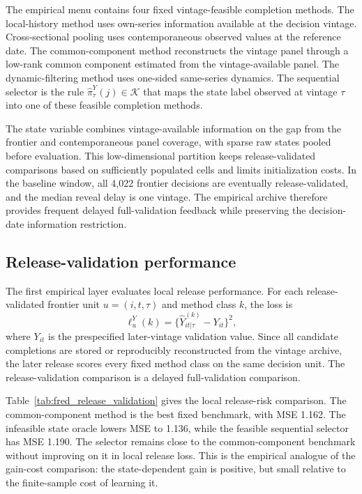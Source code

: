 \documentclass[a4paper, 12pt]{article}
\theoremstyle{plain}
\theoremstyle{remark}
\newcommand{\Kcal}{\mathcal{K}}
\newcommand{\1}{\mathbf{1}}
\begin{document}
The empirical menu contains four fixed vintage-feasible completion methods. The local-history method uses own-series information available at the decision vintage. Cross-sectional pooling uses contemporaneous observed values at the reference date. The common-component method reconstructs the vintage panel through a low-rank common component estimated from the vintage-available panel. The dynamic-filtering method uses one-sided same-series dynamics. The sequential selector is the rule \(\widehat\pi^Y_\tau(j)\in\Kcal\) that maps the state label observed at vintage \(\tau\) into one of these feasible completion methods.

The state variable combines vintage-available information on the gap from the frontier and contemporaneous panel coverage, with sparse raw states pooled before evaluation. This low-dimensional partition keeps release-validated comparisons based on sufficiently populated cells and limits initialization costs. In the baseline window, all 4,022 frontier decisions are eventually release-validated, and the median reveal delay is one vintage. The empirical archive therefore provides frequent delayed full-validation feedback while preserving the decision-date information restriction.

\subsection{Release-validation performance}
\label{subsec:fred-release-validation}

The first empirical layer evaluates local release performance. For each release-validated frontier unit \(u=(i,t,\tau)\) and method class \(k\), the loss is
\[
\ell^Y_u(k)=\{\widehat Y^{(k)}_{it|\tau}-Y_{it}\}^2,
\]
where \(Y_{it}\) is the prespecified later-vintage validation value. Since all candidate completions are stored or reproducibly reconstructed from the vintage archive, the later release scores every fixed method class on the same decision unit. The release-validation comparison is a delayed full-validation comparison.

Table~\ref{tab:fred_release_validation} gives the local release-risk comparison. The common-component method is the best fixed benchmark, with MSE 1.162. The infeasible state oracle lowers MSE to 1.136, while the feasible sequential selector has MSE 1.190. The selector remains close to the common-component benchmark without improving on it in local release loss. This is the empirical analogue of the gain-cost comparison: the state-dependent gain is positive, but small relative to the finite-sample cost of learning it.
\end{document}
